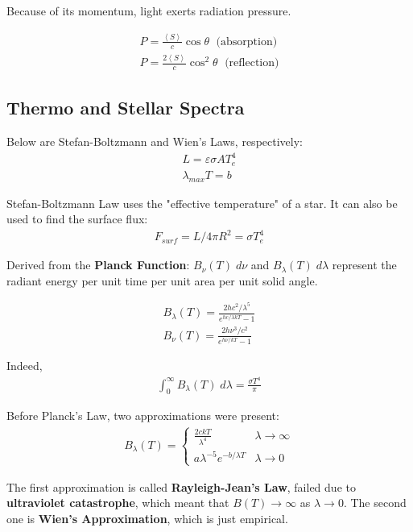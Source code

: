 \documentclass[12pt]{article}
\begin{document}
Because of its momentum, light exerts radiation pressure.

\begin{align*}
    P = \frac{\left<S\right>}{c}\cos\theta\;\text{ (absorption)} \\
    P = \frac{2\left<S\right>}{c}\cos^2\theta\;\text{ (reflection)}
\end{align*}

\subsection{Thermo and Stellar Spectra}

Below are Stefan-Boltzmann and Wien's Laws, respectively:
\begin{align*}
    L = \varepsilon\sigma AT_e^4\\
    \lambda_{max}T = b
\end{align*}

Stefan-Boltzmann Law uses the "effective temperature" of a star. It can also be used to find the surface flux:
\begin{align*}
    F_{surf} = L/4\pi R^2 = \sigma T_e^4
\end{align*}

Derived from the \textbf{Planck Function}: $B_{\nu}(T)\;d\nu$ and $B_{\lambda}(T)\;d\lambda$ represent the radiant energy per unit time per unit area per unit solid angle.

\begin{align*}
    B_{\lambda}(T) = \frac{2hc^2/\lambda^5}{e^{hc/\lambda kT} - 1} \\
    B_{\nu}(T) = \frac{2h\nu^3/c^2}{e^{h\nu/kT} - 1}
\end{align*}

Indeed,
\begin{align*}
    \int_{0}^{\infty}B_{\lambda}(T)\;d\lambda = \frac{\sigma T^4}{\pi}
\end{align*}

Before Planck's Law, two approximations were present:
\begin{align*}
    B_{\lambda}(T) = \begin{cases}
        \frac{2ckT}{\lambda^4} & \lambda\to\infty \\
        a\lambda^{-5}e^{-b/\lambda T} & \lambda\to 0
    \end{cases}
\end{align*}

The first approximation is called \textbf{Rayleigh-Jean's Law}, failed due to \textbf{ultraviolet catastrophe}, which meant that $B(T)\to\infty$ as $\lambda\to 0$.
The second one is \textbf{Wien's Approximation}, which is just empirical.
\end{document}
